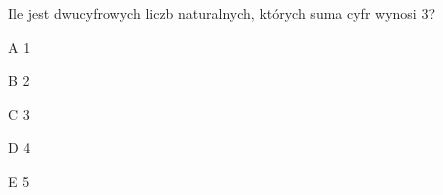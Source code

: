 \begin{tresc}
Ile jest dwucyfrowych liczb naturalnych, których suma cyfr wynosi 3?
\end{tresc}
\begin{wariant}{A} 1 \end{wariant}
\begin{wariant}{B} 2 \end{wariant}
\begin{wariant}{C} 3 \end{wariant}
\begin{wariant}{D} 4 \end{wariant}
\begin{wariant}{E} 5 \end{wariant}
